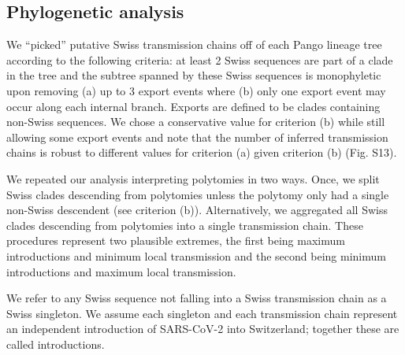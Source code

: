 \documentclass[9pt,twoside,lineno]{pnas-new} %
\begin{document}
{\subsection*{Phylogenetic analysis}
We ``picked'' putative Swiss transmission chains off of each Pango lineage tree according to the following criteria: at least 2 Swiss sequences are part of a clade in the tree and the subtree spanned by these Swiss sequences is monophyletic upon removing (a) up to 3 export events where (b) only one export event may occur along each internal branch. Exports are defined to be clades containing non-Swiss sequences. We chose a conservative value for criterion (b) while still allowing some export events and note that the number of inferred transmission chains is robust to different values for criterion (a) given criterion (b) (Fig. S13).

We repeated our analysis interpreting polytomies in two ways. Once, we split Swiss clades descending from polytomies unless the polytomy only had a single non-Swiss descendent (see criterion (b)). Alternatively, we aggregated all Swiss clades descending from polytomies into a single transmission chain. These procedures represent two plausible extremes, the first being maximum introductions and minimum local transmission and the second being minimum introductions and maximum local transmission.

We refer to any Swiss sequence not falling into a Swiss transmission chain as a Swiss singleton. We assume each singleton and each transmission chain represent an independent introduction of SARS-CoV-2 into Switzerland; together these are called introductions.


}
\end{document}
